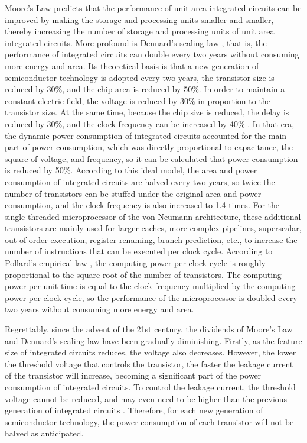 Moore's Law predicts that the performance of unit area integrated circuits can be improved by making the storage and processing units smaller and smaller, thereby increasing the number of storage and processing units of unit area integrated circuits. More profound is Dennard's scaling law \cite{dennard1974design}, that is, the performance of integrated circuits can double every two years without consuming more energy and area. Its theoretical basis is that a new generation of semiconductor technology is adopted every two years, the transistor size is reduced by 30\%, and the chip area is reduced by 50\%. In order to maintain a constant electric field, the voltage is reduced by 30\% in proportion to the transistor size. At the same time, because the chip size is reduced, the delay is reduced by 30\%, and the clock frequency can be increased by 40\% \cite{borkar1999design,borkar2011future}. In that era, the dynamic power consumption of integrated circuits accounted for the main part of power consumption, which was directly proportional to capacitance, the square of voltage, and frequency, so it can be calculated that power consumption is reduced by 50\%. According to this ideal model, the area and power consumption of integrated circuits are halved every two years, so twice the number of transistors can be stuffed under the original area and power consumption, and the clock frequency is also increased to 1.4 times. For the single-threaded microprocessor of the von Neumann architecture, these additional transistors are mainly used for larger caches, more complex pipelines, superscalar, out-of-order execution, register renaming, branch prediction, etc., to increase the number of instructions that can be executed per clock cycle. According to Pollard's empirical law \cite{pollackpollack}, the computing power per clock cycle is roughly proportional to the square root of the number of transistors. The computing power per unit time is equal to the clock frequency multiplied by the computing power per clock cycle, so the performance of the microprocessor is doubled every two years without consuming more energy and area.

Regrettably, since the advent of the 21st century, the dividends of Moore's Law and Dennard's scaling law have been gradually diminishing. Firstly, as the feature size of integrated circuits reduces, the voltage also decreases. However, the lower the threshold voltage that controls the transistor, the faster the leakage current of the transistor will increase, becoming a significant part of the power consumption of integrated circuits. To control the leakage current, the threshold voltage cannot be reduced, and may even need to be higher than the previous generation of integrated circuits \cite{borkar1999design}. Therefore, for each new generation of semiconductor technology, the power consumption of each transistor will not be halved as anticipated. 

